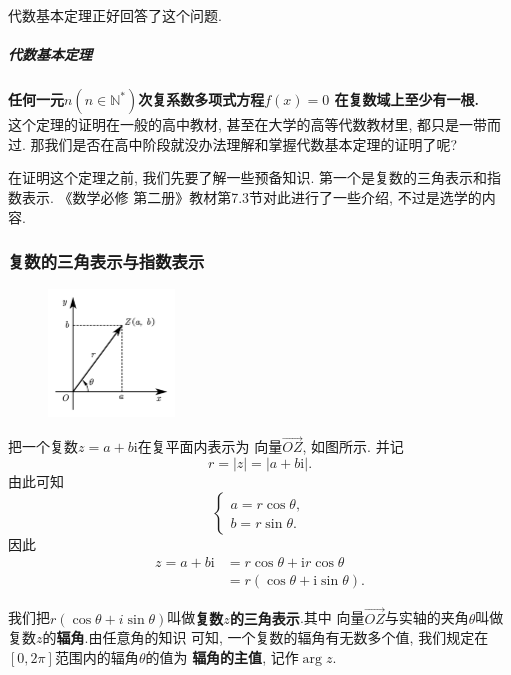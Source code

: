 \documentclass[12pt,a4paper]{ctexart}
\begin{document}
代数基本定理正好回答了这个问题.

\subparagraph{代数基本定理} \textbf{\heiti 任何一元$n (n \in \mathbb{N^*} )$次复系数多项式方程$f(x) = 0$
    在复数域上至少有一根.}\\

这个定理的证明在一般的高中教材, 甚至在大学的高等代数教材里, 都只是一带而过.
那我们是否在高中阶段就没办法理解和掌握代数基本定理的证明了呢?

在证明这个定理之前, 我们先要了解一些预备知识. 第一个是复数的三角表示和指数表示.
《数学必修 第二册》教材第7.3节对此进行了一些介绍,
不过是选学的内容.

\subsubsection{复数的三角表示与指数表示}

\begin{figure}
    \flushright
    \includegraphics[width=0.3\textwidth]{Untitled.pdf}
    \label{fig5}
\end{figure}

把一个复数$z = a+b\mathrm{i}$在复平面内表示为
向量$\overrightarrow{OZ}$, 如图所示. 并记
$$r = \left\lvert z \right\rvert = \left\lvert a + b\mathrm{i} \right\rvert .$$
由此可知
\begin{equation*}
    \begin{cases*}
        a = r\cos \theta, \\
        b = r\sin \theta.
    \end{cases*}
\end{equation*}
因此
\begin{align*}
    z = a + b\mathrm{i} & = r\cos \theta + \mathrm{i}r \cos \theta  \\
                        & = r(\cos \theta + \mathrm{i}\sin \theta).
\end{align*}

我们把$r(\cos \theta + i\sin \theta)$叫做\textbf{复数$z$的三角表示}.其中
向量$\overrightarrow{OZ}$与实轴的夹角$\theta$叫做复数$z$的\textbf{辐角}.由任意角的知识
可知, 一个复数的辐角有无数多个值, 我们规定在$[0, 2\pi]$范围内的辐角$\theta$的值为
\textbf{辐角的主值}, 记作$\arg z$.
\end{document}

